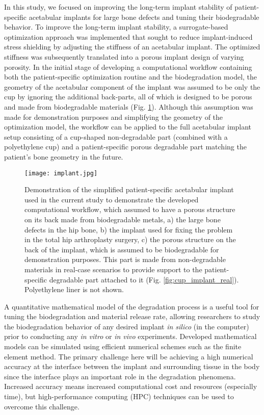 In this study, we focused on improving the long-term implant stability of patient-specific acetabular implants for large bone defects and tuning their biodegradable behavior. To improve the long-term implant stability, a surrogate-based optimization approach was implemented that sought to reduce implant-induced stress shielding by adjusting the stiffness of an acetabular implant. The optimized stiffness was subsequently translated into a porous implant design of varying porosity. In the initial stage of developing a computational workflow containing both the patient-specific optimization routine and the biodegradation model, the geometry of the acetabular component of the implant was assumed to be only the cup by ignoring the additional back-parts, all of which is designed to be porous and made from biodegradable materials (Fig. \ref{fig:cup_implant}). Although this assumption was made for demonstration purposes and simplifying the geometry of the optimization model, the workflow can be applied to the full acetabular implant setup consisting of a cup-shaped non-degradable part (combined with a polyethylene cup) and a patient-specific porous degradable part matching the patient's bone geometry in the future.

\begin{figure}[h]
\centering
\medskip
\texttt{[image: implant.jpg]}
\caption[Demonstration of the simplified patient-specific acetabular implant]{Demonstration of the simplified patient-specific acetabular implant used in the current study to demonstrate the developed computational workflow, which assumed to have a porous structure on its back made from biodegradable metals, a) the large bone defects in the hip bone, b) the implant used for fixing the problem in the total hip arthroplasty surgery, c) the porous structure on the back of the implant, which is assumed to be biodegradable for demonstration purposes. This part is made from non-degradable materials in real-case scenarios to provide support to the patient-specific degradable part attached to it (Fig. \ref{fig:cup_implant_real}). Polyethylene liner is not shown.} \label{fig:cup_implant}
\end{figure}

A quantitative mathematical model of the degradation process is a useful tool for tuning the biodegradation and material release rate, allowing researchers to study the biodegradation behavior of any desired implant \textit{in silico} (in the computer) prior to conducting any \textit{in vitro} or \textit{in vivo} experiments. Developed mathematical models can be simulated using efficient numerical schemes such as the finite element method. The primary challenge here will be achieving a high numerical accuracy at the interface between the implant and surrounding tissue in the body since the interface plays an important role in the degradation phenomena. Increased accuracy means increased computational cost and resources (especially time), but high-performance computing (\gls{HPC}) techniques can be used to overcome this challenge.

